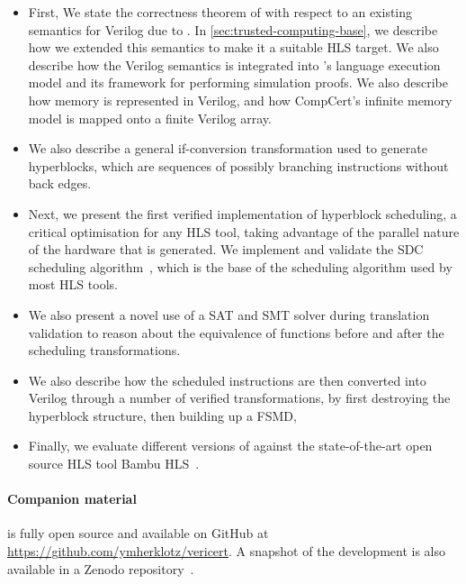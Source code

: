 \begin{itemize}
\item First, We state the correctness theorem of \vericert{} with respect to an
  existing semantics for Verilog due to
  \textcite{lööw19_proof_trans_veril_devel_hol}. In
  \cref{sec:trusted-computing-base}, we describe how we extended this semantics
  to make it a suitable \gls{HLS} target.  We also describe how the Verilog
  semantics is integrated into \compcert{}'s language execution model and its
  framework for performing simulation proofs.  We also describe how memory is
  represented in Verilog, and how CompCert's infinite memory model is mapped
  onto a finite Verilog array.

\item We also describe a general if-conversion transformation used to generate
  hyperblocks, which are sequences of possibly branching instructions without
  back edges.

\item Next, we present the first verified implementation of hyperblock
  scheduling, a critical optimisation for any \gls{HLS} tool, taking advantage
  of the parallel nature of the hardware that is generated.  We implement and
  validate the \gls{SDC} scheduling algorithm~\cite{cong06_sdc}, which is the
  base of the scheduling algorithm used by most \gls{HLS} tools.

\item We also present a novel use of a SAT and SMT solver during translation
  validation to reason about the equivalence of functions before and after the
  scheduling transformations.

\item We also describe how the scheduled instructions are then converted into
  Verilog through a number of verified transformations, by first destroying the
  hyperblock structure, then building up a \gls{FSMD},

\item Finally, we evaluate different versions of \vericert{} against the
  state-of-the-art open source \gls{HLS} tool Bambu
  HLS~\cite{bambu_hls}.
\end{itemize}

\paragraph{Companion material}
\vericert{} is fully open source and available on GitHub at
\url{https://github.com/ymherklotz/vericert}. A snapshot of the \vericert{}
development is also available in a Zenodo
repository~\cite{yann_herklotz_2021_5093839}.

